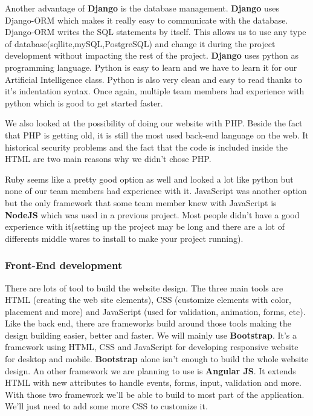 Another advantage of \textbf{Django} is the database management. \textbf{Django} uses Django-ORM which makes it really easy to communicate with the database. Django-ORM writes the SQL statements by itself. This allows us to use any type of database(sqllite,mySQL,PostgreSQL) and change it during the project development without impacting the rest of the project.
\textbf{Django} uses python as programming language. Python is easy to learn and we have to learn it for our Artificial Intelligence class.
Python is also very clean and easy to read thanks to it's indentation syntax. Once again, multiple team members had experience with python which is good to get started faster.\newline

We also looked at the possibility of doing our website with PHP. Beside the fact that PHP is getting old, it is still the most used back-end language on the web. It historical security problems and the fact that the code is included inside the HTML are two main reasons why we didn't chose PHP.\newline

Ruby seems like a pretty good option as well and looked a lot like python but none of our team members had experience with it. JavaScript was another option but the only framework that some team member knew with JavaScript is \textbf{NodeJS} which was used in a previous project. Most people didn't have a good experience with it(setting up the project may be long and there are a lot of differents middle wares to install to make your project running).

\subsubsection{Front-End development}

There are lots of tool to build the website design. The three main tools are HTML (creating the web site elements), CSS (customize elements with color, placement and more) and JavaScript (used for validation, animation, forms, etc). Like the back end, there are frameworks build around those tools making the design building easier, better and faster. We will mainly use \textbf{Bootstrap}. It's a framework using HTML, CSS and JavaScript for developing responsive website for desktop and mobile. \textbf{Bootstrap} alone isn't enough to build the whole website design. An other framework we are planning to use is \textbf{Angular JS}. It extends HTML with new attributes to handle events, forms, input, validation and more. With those two framework we'll be able to build to most part of the application. We'll just need to add some more CSS to customize it.

